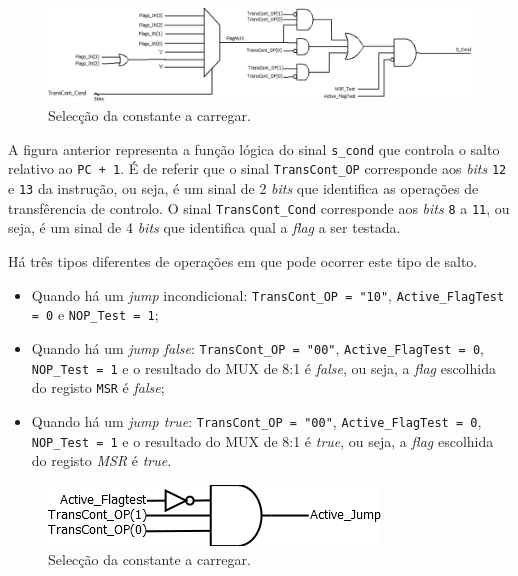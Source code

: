 \documentclass[11pt]{article}
\numberwithin{equation}{section}
\begin{document}
\vspace{2mm}

\begin{figure}[H]
	\centering
	\includegraphics[keepaspectratio=true, scale=0.4]{imagens/Flagteste}
	\caption{Selecção da constante a carregar.}
	\vspace{-0.8em}
\end{figure}

A figura anterior representa a função lógica do sinal \texttt{s\_cond} que controla o salto relativo ao \texttt{PC + 1}. É  de referir que o sinal \texttt{TransCont\_OP} corresponde aos \textit{bits} \texttt{12} e \texttt{13} da instrução, ou seja, é um sinal de 2 \textit{bits} que identifica as operações de transfêrencia de controlo. O sinal \texttt{TransCont\_Cond} corresponde aos \textit{bits} \texttt{8} a \texttt{11}, ou seja, é um sinal de 4 \textit{bits} que identifica qual a \textit{flag} a ser testada.

Há três tipos diferentes de operações em que pode ocorrer este tipo de salto.

\begin{itemize}
	\item Quando há um \textit{jump} incondicional: \texttt{TransCont\_OP = "10"}, \texttt{Active\_FlagTest = 0} e \texttt{NOP\_Test = 1};
	\vspace{-2.5mm}
	\item Quando há um \textit{jump false}: \texttt{TransCont\_OP = "00"}, \texttt{Active\_FlagTest = 0}, \texttt{NOP\_Test = 1} e o resultado do MUX de 8:1 é \textit{false}, ou seja, a \textit{flag} escolhida do registo \texttt{MSR} é \textit{false};
	\vspace{-2.5mm}
	\item Quando há um \textit{jump true}: \texttt{TransCont\_OP = "00"}, \texttt{Active\_FlagTest = 0}, \texttt{NOP\_Test = 1} e o resultado do MUX de 8:1 é \textit{true}, ou seja, a \textit{flag} escolhida do registo \textit{MSR} é \textit{true}.
\end{itemize}

\begin{figure}[H]
	\centering
	\includegraphics[keepaspectratio=true, scale=0.55]{imagens/activejump}
	\caption{Selecção da constante a carregar.}
	\vspace{-0.8em}
\end{figure}
\end{document}
